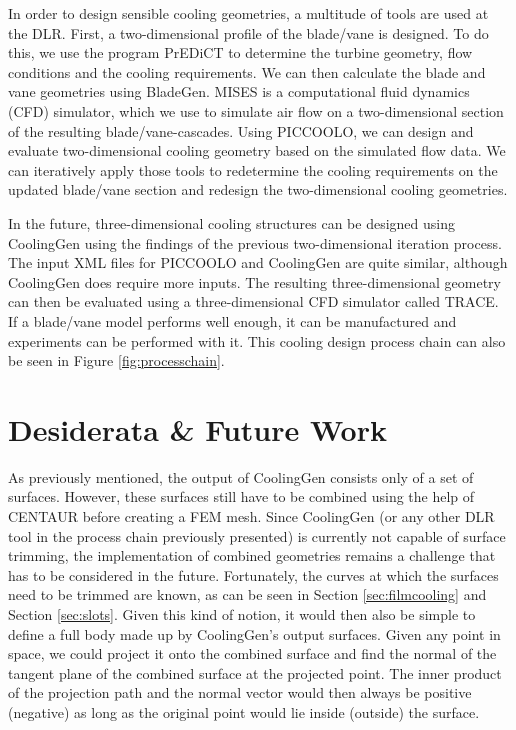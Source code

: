 \documentclass[a4paper, 11pt]{report}
\theoremstyle{definition}
\begin{document}
		In order to design sensible cooling geometries, a multitude of tools are used at the DLR. First, a two-dimensional profile of the blade/vane is designed. To do this, we use the program PrEDiCT to determine the turbine geometry, flow conditions and the cooling requirements. We can then calculate the blade and vane geometries using BladeGen. MISES is a computational fluid dynamics (CFD) simulator, which we use to simulate air flow on a two-dimensional section of the resulting blade/vane-cascades. Using PICCOOLO, we can design and evaluate two-dimensional cooling geometry based on the simulated flow data. We can iteratively apply those tools to redetermine the cooling requirements on the updated blade/vane section and redesign the two-dimensional cooling geometries.

		In the future, three-dimensional cooling structures can be designed using CoolingGen using the findings of the previous two-dimensional iteration process. The input XML files for PICCOOLO and CoolingGen are quite similar, although CoolingGen does require more inputs. The resulting three-dimensional geometry can then be evaluated using a three-dimensional CFD simulator called TRACE. If a blade/vane model performs well enough, it can be manufactured and experiments can be performed with it. This cooling design process chain can also be seen in Figure \ref{fig:processchain}.

	\section{Desiderata \& Future Work}
		As previously mentioned, the output of CoolingGen consists only of a set of surfaces. However, these surfaces still have to be combined using the help of CENTAUR before creating a FEM mesh. Since CoolingGen (or any other DLR tool in the process chain previously presented) is currently not capable of surface trimming, the implementation of combined geometries remains a challenge that has to be considered in the future. Fortunately, the curves at which the surfaces need to be trimmed are known, as can be seen in Section \ref{sec:filmcooling} and Section \ref{sec:slots}. Given this kind of notion, it would then also be simple to define a full body made up by CoolingGen's output surfaces. Given any point in space, we could project it onto the combined surface and find the normal of the tangent plane of the combined surface at the projected point. The inner product of the projection path and the normal vector would then always be positive (negative) as long as the original point would lie inside (outside) the surface.
\end{document}
